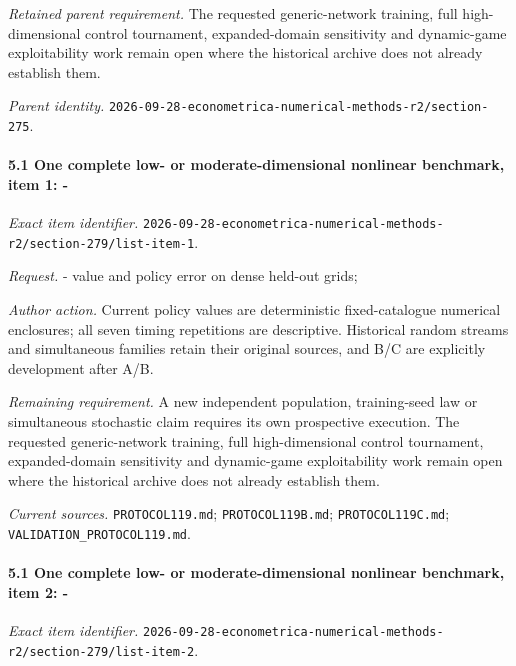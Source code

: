 \par\emph{Retained parent requirement.} The requested generic-network training, full high-dimensional control tournament, expanded-domain sensitivity and dynamic-game exploitability work remain open where the historical archive does not already establish them.

\par\emph{Parent identity.} \nolinkurl{2026-09-28-econometrica-numerical-methods-r2/section-275}.

\paragraph{5.1 One complete low- or moderate-dimensional nonlinear benchmark, item 1: -}

\emph{Exact item identifier.} \nolinkurl{2026-09-28-econometrica-numerical-methods-r2/section-279/list-item-1}.

\par\emph{Request.} - value and policy error on dense held-out grids;

\par\emph{Author action.} Current policy values are deterministic fixed-catalogue numerical enclosures; all seven timing repetitions are descriptive. Historical random streams and simultaneous families retain their original sources, and B/\allowbreak{}C are explicitly development after A/\allowbreak{}B.

\par\emph{Remaining requirement.} A new independent population, training-seed law or simultaneous stochastic claim requires its own prospective execution. The requested generic-network training, full high-dimensional control tournament, expanded-domain sensitivity and dynamic-game exploitability work remain open where the historical archive does not already establish them.

\par\emph{Current sources.} \nolinkurl{PROTOCOL119.md}; \nolinkurl{PROTOCOL119B.md}; \nolinkurl{PROTOCOL119C.md}; \nolinkurl{VALIDATION_PROTOCOL119.md}.

\paragraph{5.1 One complete low- or moderate-dimensional nonlinear benchmark, item 2: -}

\emph{Exact item identifier.} \nolinkurl{2026-09-28-econometrica-numerical-methods-r2/section-279/list-item-2}.

